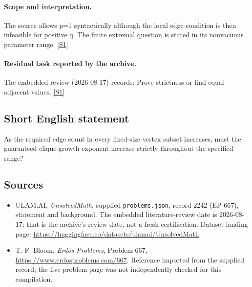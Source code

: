 \documentclass[11pt,a4paper]{article}
\newcommand{\sref}[2]{\hyperlink{source:#1:#2}{[S#2]}}
\begin{document}
\paragraph{Scope and interpretation.}

The source allows p=1 syntactically although the local edge condition is then infeasible for positive q. The finite extremal question is stated in its nonvacuous parameter range. \sref{2242}{1}

\paragraph{Residual task reported by the archive.}

The embedded review (2026-08-17) records: Prove strictness or find equal adjacent values. \sref{2242}{1}

\subsection{Short English statement}

As the required edge count in every fixed-size vertex subset increases, must the guaranteed clique-growth exponent increase strictly throughout the specified range?

\subsection{Sources}

{\small

\begin{itemize}

\item[\hypertarget{source:2242:1}{S1}] ULAM.AI, \emph{UnsolvedMath}, supplied \texttt{problems.json}, record 2242 (EP-667), statement and background. The embedded literature-review date is 2026-08-17; that is the archive’s review date, not a fresh certification. Dataset landing page: \url{https://huggingface.co/datasets/ulamai/UnsolvedMath}.

\item[\hypertarget{source:2242:2}{S2}] T. F. Bloom, \emph{Erdős Problems}, Problem 667, \url{https://www.erdosproblems.com/667}. Reference imported from the supplied record; the live problem page was not independently checked for this compilation.

\end{itemize}

}

\label{end:2242}
\end{document}
